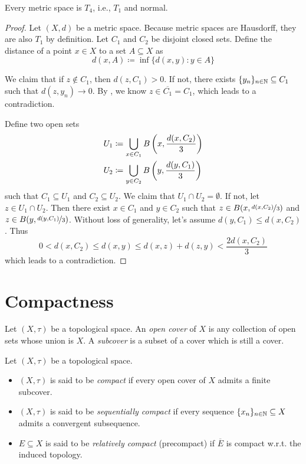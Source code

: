 \documentclass{techreport}
\begin{document}
\begin{proposition}\label{Prop:MetricT4}
	Every metric space is $T_4$, i.e., $T_1$ and normal.
\end{proposition}
\begin{proof}
	Let $(X,d)$ be a metric space.
	Because metric spaces are Hausdorff, they are also $T_1$ by definition.
	Let $C_1$ and $C_2$ be disjoint closed sets.
	Define the distance of a point $x \in X$ to a set $A \subseteq X$ as
	\[
	d(x,A) \coloneqq \inf \{ d(x,y) : y \in A \}
	\]
	
	We claim that if $z \not\in C_1$, then $d(z,C_1) > 0$.
	If not, there exists $\{y_n\}_{n \in \mathbb{N}} \subseteq C_1$ such that $d(z,y_n) \rightarrow 0$.
	By , we know $z \in \overline{C_1} = C_1$, which leads to a contradiction.
	
	Define two open sets
	\begin{align}
		U_1 & \coloneqq \bigcup_{x \in C_1} B\left({x,\frac{d(x,C_2)}{3}}\right) \\
		U_2 & \coloneqq \bigcup_{y \in C_2} B\left({y,\frac{d(y,C_1)}{3}}\right)
	\end{align}
	such that $C_1 \subseteq U_1$ and $C_2 \subseteq U_2$.
	We claim that $U_1 \cap U_2 = \emptyset$.
	If not, let $z \in U_1 \cap U_2$.
	Then there exist $x \in C_1$ and $y \in C_2$ such that $z \in B(x,\nicefrac{d(x,C_2)}{3})$ and $z \in B(y,\nicefrac{d(y,C_1)}{3})$.
	Without loss of generality, let's assume $d(y,C_1) \le d(x,C_2)$.
	Thus
	\[
	0 < d(x,C_2) \le d(x,y) \le d(x,z)+d(z,y) < \frac{2d(x,C_2)}{3}
	\]
	which leads to a contradiction.
\end{proof}

\section{Compactness}

\begin{definition}\label{De:Covers}
	Let $(X,\tau)$ be a topological space.
	An \emph{open cover} of $X$ is any collection of open sets whose union is $X$.
	A \emph{subcover} is a subset of a cover which is still a cover.
\end{definition}

\begin{definition}\label{De:CompactSpace}
	Let $(X,\tau)$ be a topological space.
	\begin{itemize}
		\item $(X,\tau)$ is said to be \emph{compact} if every open cover of $X$ admits a finite subcover.
		\item $(X,\tau)$ is said to be \emph{sequentially compact} if every sequence $\{x_n\}_{n \in \mathbb{N}} \subseteq X$ admits a convergent subsequence.
		\item $E \subseteq X$ is said to be \emph{relatively compact} (precompact) if $\overline{E}$ is compact w.r.t. the induced topology.
	\end{itemize}
\end{definition}
\end{document}
